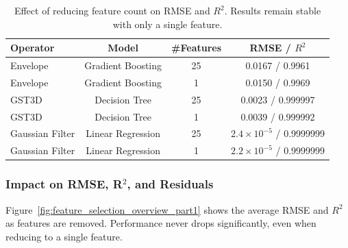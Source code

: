 \begin{table}[htbp]
    \centering
    \begin{tabular}{lccc}
        \hline
        \textbf{Operator} & \textbf{Model}    & \textbf{\#Features} & \textbf{\ac{RMSE} / $R^2$}     \\
        \hline
        Envelope          & Gradient Boosting & 25                  & 0.0167 / 0.9961                \\
        Envelope          & Gradient Boosting & 1                   & 0.0150 / 0.9969                \\
        \ac{GST3D}        & Decision Tree     & 25                  & 0.0023 / 0.999997              \\
        \ac{GST3D}        & Decision Tree     & 1                   & 0.0039 / 0.999992              \\
        Gaussian Filter   & Linear Regression & 25                  & $2.4\times10^{-5}$ / 0.9999999 \\
        Gaussian Filter   & Linear Regression & 1                   & $2.2\times10^{-5}$ / 0.9999999 \\
        \hline
    \end{tabular}
    \caption{Effect of reducing feature count on RMSE and $R^2$. Results remain stable with only a single feature.}
    \label{tab:feature_selection_minimal_impact}
\end{table}

\subsubsection{Impact on RMSE, R\texorpdfstring{$^2$}{2}, and Residuals}
\label{subsec:impact-on-rmse-r2-and-residuals}

Figure~\ref{fig:feature_selection_overview_part1} shows the average RMSE and $R^2$ as features are removed.
Performance never drops significantly, even when reducing to a single feature.

